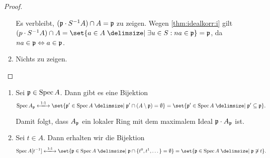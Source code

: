 \documentclass[12pt,a4paper]{scrartcl}
\theoremstyle{cplain}
\theoremstyle{cdef}
\begin{document}
\begin{proof}
\begin{enumerate}[label=\ref{thm:idealkorr:\roman*}]
		Es verbleibt, $(\mathfrak{p}\cdot S^{-1}A)\cap  A = \mathfrak{p}$ zu zeigen. Wegen \ref{thm:idealkorr:i} gilt $(p\cdot S^{-1}A)\cap A = \set{a\in A\given\exists u\in S: na \in \fp} = \fp$, da $na\in \mathfrak{p}\Leftrightarrow a \in \mathfrak{p}$.
		\item Nichts zu zeigen. \qedhere
	\end{enumerate}
\end{proof}

\begin{bsp}
	\leavevmode
	\begin{enumerate}
		\item Sei $\mathfrak{p}\in\operatorname{Spec} A$. Dann gibt es eine Bijektion
		\[\Spec A_{\fp} \xlongleftrightarrow{1:1} \set{\fp'\in \Spec A\given\fp'\cap(A\setminus \fp) = \emptyset}  = \set{\fp'\in \Spec A\given\fp'\subseteq \fp}.\]
		
		Damit folgt, dass $A_{\mathfrak{p}}$ ein lokaler Ring mit dem maximalem Ideal $\mathfrak{p}\cdot A_{\mathfrak{p}}$ ist.
		\item Sei $t\in A$. Dann erhalten wir die Bijektion
		\[\Spec A[t^{-1}] \xlongleftrightarrow{1:1}\set{\fp\in \Spec A\given\fp\cap\{t^0, t^1,\dots\} = \emptyset} = \set{\fp\in \Spec A\given\fp\not \ni t}. \]
	\end{enumerate}
\end{bsp}
\end{document}
